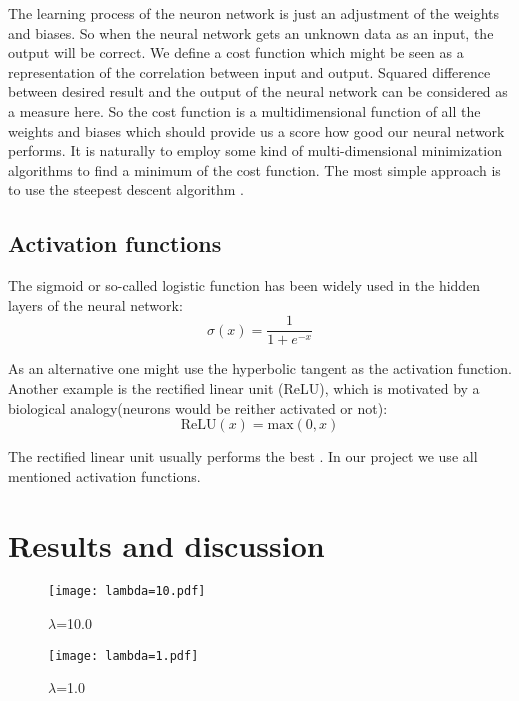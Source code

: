 \documentclass[10pt]{article}
\begin{document}
The learning process of the neuron network is just an adjustment of the weights and biases. So when the neural network gets an unknown data as an input, the output will be correct. We define a cost function which might be seen as a representation of the correlation between input and output. Squared difference between desired result and the output of the neural network can be considered as a measure here. So the cost function is a multidimensional function of all the weights and biases which should provide us a score how good our neural network performs. It is naturally to employ some kind of multi-dimensional minimization algorithms to find a minimum of the cost function. The most simple approach is to use the steepest descent algorithm \cite{Metha}.


\subsection{Activation functions}
The sigmoid or so-called logistic function has been widely used
in the hidden layers of the neural network:
\begin{equation*}
\sigma (x) = \frac{1}{1 + e^{-x}}
\end{equation*}

As an alternative one might use the hyperbolic tangent as the activation function. Another example is the rectified linear unit (ReLU), which is motivated by a biological analogy(neurons would be reither activated or not):
\begin{equation*}
\text{ReLU} (x) = \text{max}(0,x)
\end{equation*}

The rectified linear unit usually performs the best \cite{Metha}. In our project we use all mentioned activation functions.




\section{Results and discussion}
\begin{figure}
	\centerline{\texttt{[image: lambda=10.pdf]}}
	\caption{$\lambda$=10.0}
	\label{plt:lamda10}
\end{figure}

\begin{figure}
	\centerline{\texttt{[image: lambda=1.pdf]}}
	\caption{$\lambda$=1.0}
	\label{plt:lamda1}
\end{figure}
\end{document}

